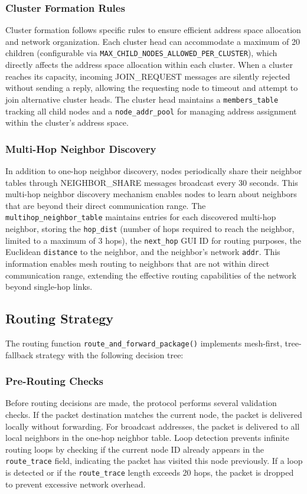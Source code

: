 \documentclass[conference]{IEEEtran}
\begin{document}
\subsubsection{Cluster Formation Rules}
Cluster formation follows specific rules to ensure efficient address space allocation and network organization. Each cluster head can accommodate a maximum of 20 children (configurable via \texttt{MAX\_CHILD\_NODES\_ALLOWED\_PER\_CLUSTER}), which directly affects the address space allocation within each cluster. When a cluster reaches its capacity, incoming JOIN\_REQUEST messages are silently rejected without sending a reply, allowing the requesting node to timeout and attempt to join alternative cluster heads. The cluster head maintains a \texttt{members\_table} tracking all child nodes and a \texttt{node\_addr\_pool} for managing address assignment within the cluster's address space.

\subsubsection{Multi-Hop Neighbor Discovery}
In addition to one-hop neighbor discovery, nodes periodically share their neighbor tables through NEIGHBOR\_SHARE messages broadcast every 30 seconds. This multi-hop neighbor discovery mechanism enables nodes to learn about neighbors that are beyond their direct communication range. The \texttt{multihop\_neighbor\_table} maintains entries for each discovered multi-hop neighbor, storing the \texttt{hop\_dist} (number of hops required to reach the neighbor, limited to a maximum of 3 hops), the \texttt{next\_hop} GUI ID for routing purposes, the Euclidean \texttt{distance} to the neighbor, and the neighbor's network \texttt{addr}. This information enables mesh routing to neighbors that are not within direct communication range, extending the effective routing capabilities of the network beyond single-hop links.

\subsection{Routing Strategy}

The routing function \texttt{route\_and\_forward\_package()} implements mesh-first, tree-fallback strategy with the following decision tree:

\subsubsection{Pre-Routing Checks}
Before routing decisions are made, the protocol performs several validation checks. If the packet destination matches the current node, the packet is delivered locally without forwarding. For broadcast addresses, the packet is delivered to all local neighbors in the one-hop neighbor table. Loop detection prevents infinite routing loops by checking if the current node ID already appears in the \texttt{route\_trace} field, indicating the packet has visited this node previously. If a loop is detected or if the \texttt{route\_trace} length exceeds 20 hops, the packet is dropped to prevent excessive network overhead.
\end{document}
